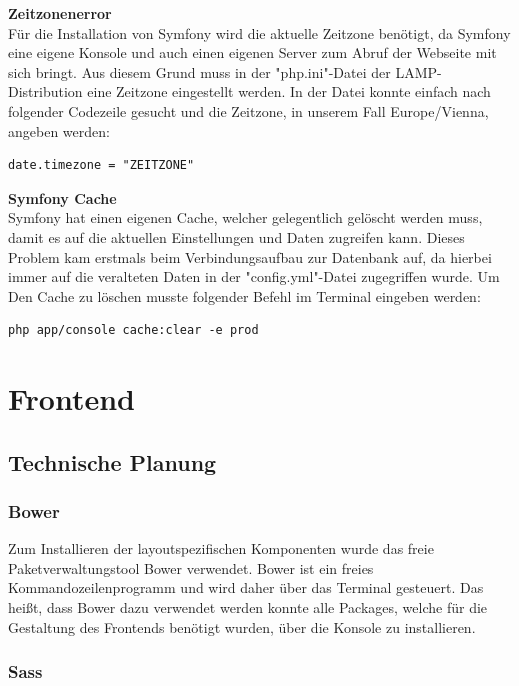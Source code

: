 \textbf{Zeitzonenerror}\\
Für die Installation von Symfony wird die aktuelle Zeitzone benötigt, da Symfony eine eigene Konsole und auch einen eigenen Server zum Abruf der Webseite mit sich bringt.
Aus diesem Grund muss in der "php.ini"-Datei der LAMP-Distribution eine Zeitzone eingestellt werden. In der Datei konnte einfach nach folgender Codezeile gesucht und die Zeitzone, in unserem Fall Europe/Vienna, angeben werden:
	\lstset{language=java}
  	\begin{lstlisting}
date.timezone = "ZEITZONE"
  	\end{lstlisting}
\textbf{Symfony Cache}\\
Symfony hat einen eigenen Cache, welcher gelegentlich gelöscht werden muss, damit es auf die aktuellen Einstellungen und Daten zugreifen kann.
Dieses Problem kam erstmals beim Verbindungsaufbau zur Datenbank auf, da hierbei immer auf die veralteten Daten in der "config.yml"-Datei zugegriffen wurde.
Um Den Cache zu löschen musste folgender Befehl im Terminal eingeben werden:
	\lstset{language=bash}
  	\begin{lstlisting}
php app/console cache:clear -e prod
  	\end{lstlisting}

\section{Frontend}

  \subsection{Technische Planung}

    \subsubsection{Bower}

Zum Installieren der layoutspezifischen Komponenten wurde das freie Paketverwaltungstool {Bower\cite{bower}} verwendet. Bower ist ein freies Kommandozeilenprogramm und wird daher über das Terminal gesteuert. Das heißt, dass Bower dazu verwendet werden konnte alle Packages, welche für die Gestaltung des Frontends benötigt wurden, über die Konsole zu installieren.

    \subsubsection{Sass}

